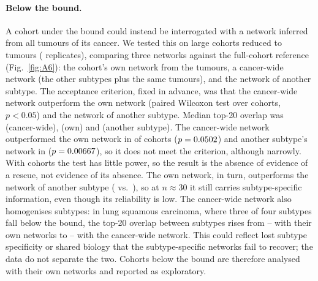 \documentclass[11pt,a4paper]{article}
\theoremstyle{plain}
\theoremstyle{remark}
\begin{document}
\paragraph{Below the bound.} A cohort under the bound could instead be interrogated with a
network inferred from all tumours of its cancer. We tested this on \Kpooledncohorts{} large
cohorts reduced to \Kpooledsmalln{} tumours (\Kpooledreplicates{} replicates), comparing three
networks against the full-cohort reference (Fig.~\ref{fig:A6}): the cohort's own network from
the \Kpooledsmalln{} tumours, a cancer-wide network (the other subtypes plus the same
\Kpooledsmalln{} tumours), and the network of another subtype. The acceptance criterion,
fixed in advance, was that the cancer-wide network outperform the own network (paired Wilcoxon
test over cohorts, $p<0.05$) and the network of another subtype. Median top-20 overlap was
\KpooledtopTwoZeromedianpooled{} (cancer-wide), \KpooledtopTwoZeromedianown{} (own) and
\KpooledtopTwoZeromedianswap{} (another subtype). The cancer-wide network outperformed the own
network in \Kpoolednbetterthanown{} of \Kpooledncohorts{} cohorts ($p=0.0502$)
and another subtype's network in \Kpoolednbetterthanswap{} ($p=0.00667$), so it
does not meet the criterion, although narrowly. With \Kpooledncohorts{} cohorts the test has little power, so the result is the absence of evidence
of a rescue, not evidence of its absence. The own network, in turn, outperforms the network of another subtype (\KpooledtopTwoZeromedianown{} vs.\ \KpooledtopTwoZeromedianswap{}), so at $n\approx30$ it still
carries subtype-specific information, even though its reliability is low. The cancer-wide network also homogenises subtypes: in lung squamous carcinoma, where
three of four subtypes fall below the bound, the top-20 overlap between subtypes rises from
\KpooledLUSCbetweenownmin--\KpooledLUSCbetweenownmax{} with their own networks to
\KpooledLUSCbetweenpooledmin--\KpooledLUSCbetweenpooledmax{} with the cancer-wide network. This could reflect lost subtype specificity or shared biology
that the subtype-specific networks fail to recover; the data do not separate the two. Cohorts below the bound are therefore
analysed with their own networks and reported as exploratory.
\end{document}
